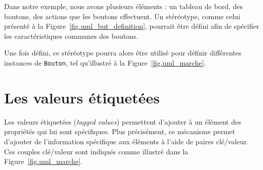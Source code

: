 


Dans notre exemple, nous avons plusieurs éléments : un tableau de bord, des boutons, des actions que les boutons effectuent.
Un stéréotype, comme celui présenté à la Figure~\ref{fig.uml_but_definition}, pourrait être d\'efini afin de sp\'ecifier les caractéristiques communes des boutons.




Une fois d\'efini, ce st\'er\'eotype pourra alors \^etre utilis\'e pour
d\'efinir diff\'erentes instances de \texttt{Bouton}, tel qu'illustré à la Figure~\ref{fig.uml_marche}.



\section{Les valeurs \'etiquet\'ees}

Les valeurs \'etiquet\'ees (\emph{tagged values}) permettent d'ajouter \`a un \'el\'ement des propriétés qui lui sont spécifiques.
Plus pr\'ecis\'ement, ce m\'ecanisme permet d'ajouter de l'information spécifique aux éléments \`a l'aide de paires clé/valeur.
Ces couples clé/valeur sont indiqués comme illustré dans la Figure~\ref{fig.uml_marche}.


